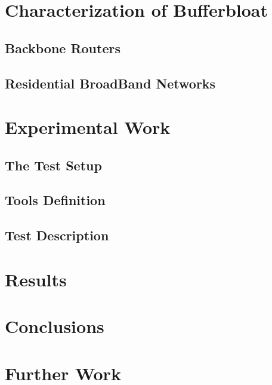 \documentclass[letter, 11pt]{article}
\begin{document}
\newpage

\section{Characterization of Bufferbloat}

\subsection{Backbone Routers}


\subsection{Residential BroadBand Networks}


\newpage

\section{Experimental Work}


\subsection{The Test Setup}


\subsection{Tools Definition}


\subsection{Test Description}


\section{Results}

\section{Conclusions}


\section{Further Work}


{}
\end{document}
